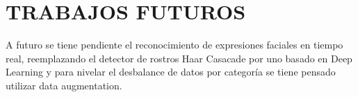 \chapter*{TRABAJOS FUTUROS}

A futuro se tiene pendiente el reconocimiento de expresiones faciales en tiempo
real, reemplazando el detector de rostros Haar Casacade por uno basado en Deep
Learning y para nivelar el desbalance de datos por categoría se tiene pensado utilizar data
augmentation.

